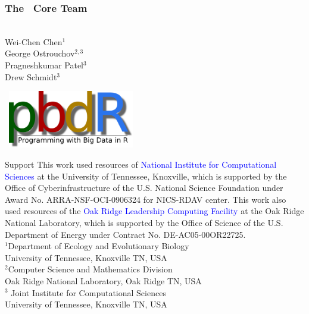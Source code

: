 \frame{  \maketitle   }

\setcounter{footnote}{0}
\begin{frame}[noframenumbering]
\frametitle{The \pbdR\ Core Team}
\begin{minipage}{1\textwidth}
  \vspace{-.6cm}
\begin{minipage}{3.6cm}
\ \\[.8cm]
Wei-Chen Chen$^1$ \\
George Ostrouchov$^{2,3}$ \\
Pragneshkumar Patel$^3$ \\
Drew Schmidt$^3$\\[2ex]
\end{minipage}
\begin{minipage}{7cm}
  \ \hfill \includegraphics[width=5.5cm]{../common/pics/logos/newpbdr}
\end{minipage}
\end{minipage}

\vspace{-.4cm}
\begin{block}{Support}\tiny
  This work used resources of \textcolor{blue}{National Institute for
  Computational Sciences} at the University of Tennessee, Knoxville,
  which is supported by the Office of Cyberinfrastructure of the
  U.S. National Science Foundation under Award  No. ARRA-NSF-OCI-0906324 
  for NICS-RDAV center. 
  This work also used resources of the \textcolor{blue}{Oak Ridge
  Leadership Computing Facility} at the Oak Ridge National
  Laboratory, which is supported by the Office of Science of the
  U.S. Department of Energy under Contract No. DE-AC05-00OR22725.\\[.2cm]
  
  $^1$Department of Ecology and Evolutionary Biology\\
  University of Tennessee, Knoxville TN, USA\\[.2cm]

  $^2$Computer Science and Mathematics Division\\
  Oak Ridge National Laboratory, Oak Ridge TN, USA\\[.2cm]
  
  $^3$ Joint Institute for Computational Sciences\\
  University of Tennessee, Knoxville TN, USA
\end{block}
\end{frame}

\setcounter{framenumber}{0}
